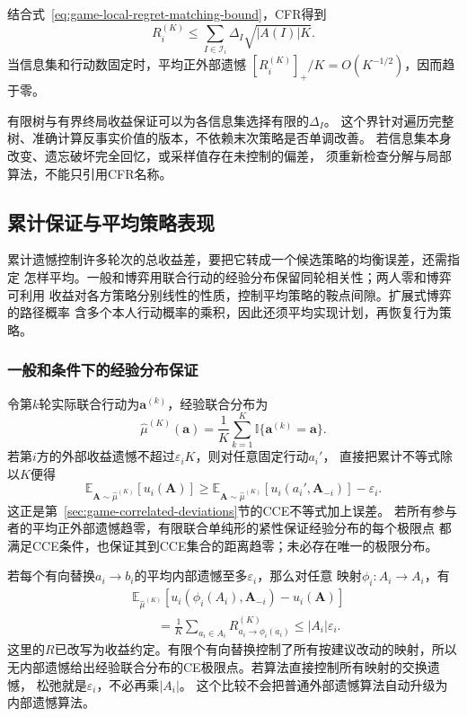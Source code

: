 结合式~\eqref{eq:game-local-regret-matching-bound}，CFR得到
\begin{equation}
  R_i^{(K)}
  \leq
  \sum_{I\in\mathcal{I}_i}
  \Delta_I\sqrt{|A(I)|K}.
  \label{eq:game-cfr-rate}
\end{equation}
当信息集和行动数固定时，平均正外部遗憾
\([R_i^{(K)}]_+/K=O(K^{-1/2})\)，因而趋于零。

有限树与有界终局收益保证可以为各信息集选择有限的\(\Delta_I\)。
这个界针对遍历完整树、准确计算反事实价值的版本，不依赖末次策略是否单调改善。
若信息集本身改变、遗忘破坏完全回忆，或采样值存在未控制的偏差，
须重新检查分解与局部算法，不能只引用CFR名称。

\subsection{累计保证与平均策略表现}
\label{sec:game-regret-average-guarantees}

累计遗憾控制许多轮次的总收益差，要把它转成一个候选策略的均衡误差，还需指定
怎样平均。一般和博弈用联合行动的经验分布保留同轮相关性；两人零和博弈可利用
收益对各方策略分别线性的性质，控制平均策略的鞍点间隙。扩展式博弈的路径概率
含多个本人行动概率的乘积，因此还须平均实现计划，再恢复行为策略。

\subsubsection{一般和条件下的经验分布保证}
\label{sec:game-empirical-equilibrium}

令第\(k\)轮实际联合行动为\(\bm a^{(k)}\)，经验联合分布为
\[
  \widehat\mu^{(K)}(\bm a)
  =\frac1K\sum_{k=1}^K\mathbb I\{\bm a^{(k)}=\bm a\}.
\]
若第\(i\)方的外部收益遗憾不超过\(\varepsilon_iK\)，则对任意固定行动\(a_i'\)，
直接把累计不等式除以\(K\)便得
\[
  \mathbb E_{\bm A\sim\widehat\mu^{(K)}}[u_i(\bm A)]
  \geq
  \mathbb E_{\bm A\sim\widehat\mu^{(K)}}
     [u_i(a_i',\bm A_{-i})]-\varepsilon_i.
\]
这正是第~\ref{sec:game-correlated-deviations}节的CCE不等式加上误差。
若所有参与者的平均正外部遗憾趋零，有限联合单纯形的紧性保证经验分布的每个极限点
都满足CCE条件，也保证其到CCE集合的距离趋零；未必存在唯一的极限分布。

若每个有向替换\(a_i\to b_i\)的平均内部遗憾至多\(\varepsilon_i\)，那么对任意
映射\(\phi_i:A_i\to A_i\)，有
\[
  \begin{aligned}
    &\mathbb E_{\widehat\mu^{(K)}}[
       u_i(\phi_i(A_i),\bm A_{-i})-u_i(\bm A)]\\
    &\qquad=\frac1K\sum_{a_i\in A_i}R_{a_i\to\phi_i(a_i)}^{(K)}
      \leq |A_i|\varepsilon_i.
  \end{aligned}
\]
这里的\(R\)已改写为收益约定。有限个有向替换控制了所有按建议改动的映射，所以
无内部遗憾给出经验联合分布的CE极限点。若算法直接控制所有映射的交换遗憾，
松弛就是\(\varepsilon_i\)，不必再乘\(|A_i|\)。
这个比较不会把普通外部遗憾算法自动升级为内部遗憾算法。

